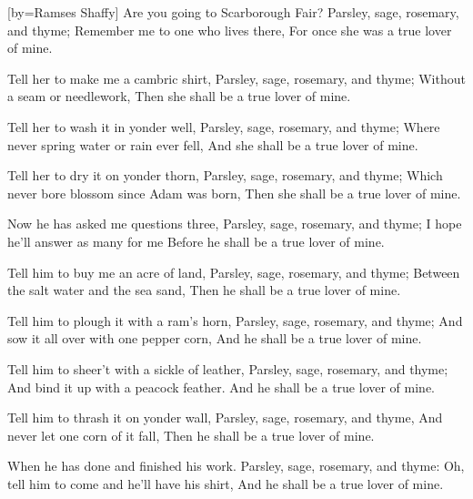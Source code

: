 [by={Ramses Shaffy}]
\beginverse
Are you going to Scarborough Fair?
Parsley, sage, rosemary, and thyme;
Remember me to one who lives there,
For once she was a true lover of mine.
\endverse

\beginverse
Tell her to make me a cambric shirt,
Parsley, sage, rosemary, and thyme;
Without a seam or needlework,
Then she shall be a true lover of mine.
\endverse

\beginverse
Tell her to wash it in yonder well,
Parsley, sage, rosemary, and thyme;
Where never spring water or rain ever fell,
And she shall be a true lover of mine.
\endverse

\beginverse
Tell her to dry it on yonder thorn,
Parsley, sage, rosemary, and thyme;
Which never bore blossom since Adam was born,
Then she shall be a true lover of mine.
\endverse

\beginverse
Now he has asked me questions three,
Parsley, sage, rosemary, and thyme;
I hope he'll answer as many for me
Before he shall be a true lover of mine.
\endverse

\beginverse
Tell him to buy me an acre of land,
Parsley, sage, rosemary, and thyme;
Between the salt water and the sea sand,
Then he shall be a true lover of mine.
\endverse

\beginverse
Tell him to plough it with a ram's horn,
Parsley, sage, rosemary, and thyme;
And sow it all over with one pepper corn,
And he shall be a true lover of mine.
\endverse

\beginverse
Tell him to sheer't with a sickle of leather,
Parsley, sage, rosemary, and thyme;
And bind it up with a peacock feather.
And he shall be a true lover of mine.
\endverse

\beginverse
Tell him to thrash it on yonder wall,
Parsley, sage, rosemary, and thyme,
And never let one corn of it fall,
Then he shall be a true lover of mine.
\endverse

\beginverse
When he has done and finished his work.
Parsley, sage, rosemary, and thyme:
Oh, tell him to come and he'll have his shirt,
And he shall be a true lover of mine.
\endverse
\endsong